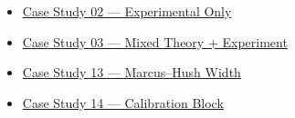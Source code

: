 \documentclass[
  11pt,
]{article}
\providecommand{\tightlist}{
  \setlength{\itemsep}{0pt}\setlength{\parskip}{0pt}}
\begin{document}
\begin{itemize}
\tightlist
\item
  \href{https://github.com/pinarsyt/overlap-calculator/blob/main/case_studies/02_experimental_only/README.md}{Case
  Study 02 --- Experimental Only}
\item
  \href{https://github.com/pinarsyt/overlap-calculator/blob/main/case_studies/03_mixed_theory_experiment/README.md}{Case
  Study 03 --- Mixed Theory + Experiment}
\item
  \href{https://github.com/pinarsyt/overlap-calculator/blob/main/case_studies/13_marcus_hush_width/README.md}{Case
  Study 13 --- Marcus--Hush Width}
\item
  \href{https://github.com/pinarsyt/overlap-calculator/blob/main/case_studies/14_calibration_block/README.md}{Case
  Study 14 --- Calibration Block}
\end{itemize}
\end{document}
